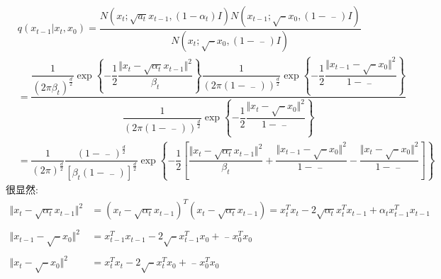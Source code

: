 \documentclass[withoutpreface,bwprint]{cumcmthesis} %
\begin{document}
	\begin{align*}
		& q(x_{t-1}|x_t,x_0)  =\dfrac{ N\left(x_t;\sqrt{a_t} x_{t-1},(1-\alpha_{t})I \right) N\left( x_{t-1}; \sqrt{\mathop{\alpha_{t-1}}\limits^{-}} x_0,\left( 1-\mathop{\alpha_{t-1}}\limits^{-} \right) I \right)  }{N\left( x_t;\sqrt{\mathop{\alpha_t}\limits^{-}} x_0,\left( 1-\mathop{\alpha_t}\limits^{-} \right) I \right)} \\
		& = \dfrac{
			\dfrac{1}{\left( 2\pi\beta_{t} \right)^{\frac{d}{2}}} \exp
			\left\{ 
			-\dfrac{1}{2} \dfrac{\Vert x_t - \sqrt{\alpha_{t}}x_{t-1}\Vert^2}{\beta_{t}} 
			\right\} \dfrac{1}{\left( 2\pi \left( 1-\mathop{\alpha_{t-1}}\limits^{-} \right) \right)^{\frac{d}{2}}}
			\exp \left\{ -\dfrac{1}{2} \dfrac{\Vert x_{t-1} - \sqrt{\mathop{\alpha_{t-1}}\limits^{-}} x_0 \Vert^2}{ 1-\mathop{\alpha_{t-1}}\limits^{-} } \right\} }{
				\dfrac{1}{\left( 2\pi \left( 1-\mathop{\alpha_{t}}\limits^{-} \right) \right)^{\frac{d}{2}}}
				\exp \left\{ -\dfrac{1}{2} \dfrac{\Vert x_{t} - \sqrt{\mathop{\alpha_{t}}\limits^{-}} x_0 \Vert^2}{ 1-\mathop{\alpha_{t}}\limits^{-} } \right\}
		}\\
	& = \dfrac{1}{\left( 2\pi \right)^{\frac{d}{2}}} \dfrac{\left( 1-\mathop{\alpha_{t}}\limits^{-} \right) ^{\frac{d}{2}} }{\left[ \beta_{t}\left( 1 - \mathop{\alpha_{t-1}}\limits^{-}  \right) \right]^\frac{d}{2}} \exp \left\{ -\dfrac{1}{2}
	\left[  
	  \dfrac{\Vert x_t - \sqrt{\alpha_{t}}x_{t-1}\Vert^2}{\beta_{t}}
	  +
	   \dfrac{\Vert x_{t-1} - \sqrt{\mathop{\alpha_{t-1}}\limits^{-}} x_0 \Vert^2}{ 1-\mathop{\alpha_{t-1}}\limits^{-} }
	   -
	   \dfrac{\Vert x_{t} - \sqrt{\mathop{\alpha_{t}}\limits^{-}} x_0 \Vert^2}{ 1-\mathop{\alpha_{t}}\limits^{-} }
	  \right] \right\}				
	\end{align*}
		很显然:
		\begin{align*}
			\Vert x_t - \sqrt{\alpha_{t}}x_{t-1}\Vert^2 & = \left( x_t - \sqrt{\alpha_{t}}x_{t-1} \right)^T \left( x_t - \sqrt{\alpha_{t}}x_{t-1} \right)=x_t^Tx_t-2\sqrt{\alpha_t}x_t^Tx_{t-1} + \alpha_{t} x_{t-1}^T x_{t-1}
			\\\\
			\Vert x_{t-1} - \sqrt{\mathop{\alpha_{t-1}}\limits^{-}} x_0 \Vert^2 & = x_{t-1}^Tx_{t-1} - 2 \sqrt{\mathop{\alpha_{t-1}}\limits^{-}} x_{t-1}^T x_0 + \mathop{\alpha_{t-1}}\limits^{-} x_0^T x_0
			\\\\
			\Vert x_{t} - \sqrt{\mathop{\alpha_{t}}\limits^{-}} x_0 \Vert^2 & = x_t^Tx_t - 2 \sqrt{\mathop{\alpha_{t}}\limits^{-}} x_{t}^T x_0 +\mathop{\alpha_{t}}\limits^{-} x_0^T x_0
		\end{align*}
\end{document}
